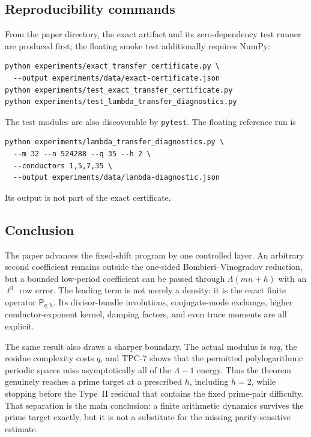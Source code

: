 \subsection{Reproducibility commands}

From the paper directory, the exact artifact and its zero-dependency test
runner are produced first; the floating smoke test additionally requires
NumPy:
\begin{verbatim}
python experiments/exact_transfer_certificate.py \
  --output experiments/data/exact-certificate.json
python experiments/test_exact_transfer_certificate.py
python experiments/test_lambda_transfer_diagnostics.py
\end{verbatim}
The test modules are also discoverable by \texttt{pytest}.  The floating
reference run is
\begin{verbatim}
python experiments/lambda_transfer_diagnostics.py \
  --m 32 --n 524288 --q 35 --h 2 \
  --conductors 1,5,7,35 \
  --output experiments/data/lambda-diagnostic.json
\end{verbatim}
Its output is not part of the exact certificate.

\subsection{Conclusion}

The paper advances the fixed-shift program by one controlled layer.  An
arbitrary second coefficient remains outside the one-sided
Bombieri--Vinogradov reduction, but a bounded low-period coefficient can be
passed through $\Lambda(mn+h)$ with an $\ell^1$ row error.  The leading term
is not merely a density: it is the exact finite operator
$\mathsf P_{q,h}$.  Its divisor-bundle involutions, conjugate-mode exchange,
higher conductor-exponent kernel, damping factors, and even trace moments
are all explicit.

The same result also draws a sharper boundary.  The actual modulus is $mq$,
the residue complexity costs $q$, and TPC-7 shows that the permitted
polylogarithmic periodic spaces miss asymptotically all of the
$\Lambda-1$ energy.  Thus the theorem genuinely reaches a prime target at a
prescribed $h$, including $h=2$, while stopping before the Type~II residual
that contains the fixed prime-pair difficulty.  That separation is the main
conclusion: a finite arithmetic dynamics survives the prime target exactly,
but it is not a substitute for the missing parity-sensitive estimate.
